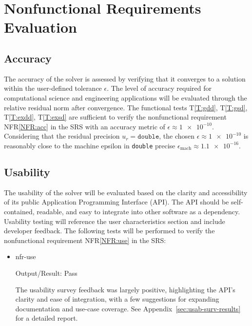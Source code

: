 \documentclass[12pt, titlepage]{article}
\newcommand{\nfrref}[1]{NFR\ref{#1}}
\newcommand{\tref}[1]{T\ref{#1}}
\begin{document}
\section{Nonfunctional Requirements Evaluation}

\subsection{Accuracy}

The accuracy of the solver is assessed by verifying that it converges to a
solution within the user-defined tolerance \(\epsilon\). The level of accuracy
required for computational science and engineering applications will be
evaluated through the relative residual norm after convergence. The functional
tests \tref{T:gdd}, \tref{T:gsd}, \tref{T:exdd}, \tref{T:exsd} are sufficient to
verify the nonfunctional requirement \nfrref{NFR:acc} in the SRS with an
accuracy metric of \(\epsilon \approx \num{1e-10}\). Considering that the
residual precision \(u_r = \texttt{double}\), the chosen \(\epsilon \approx
\num{1e-10}\) is reasonably close to the machine epsilon in \texttt{double}
precise \(\epsilon_\mathrm{mach} \approx \num{1.1e-16}\).

\subsection{Usability}

The usability of the solver will be evaluated based on the clarity and
accessibility of its public Application Programming Interface (API). The API
should be self-contained, readable, and easy to integrate into other software as
a dependency. Usability testing will reference the user characteristics section
and include developer feedback. The following tests will be performed to verify
the nonfunctional requirement \nfrref{NFR:use} in the SRS:

\begin{itemize}

\item[\tref{T:use}:]{nfr-use}

  Output/Result: Pass

  The usability survey feedback was largely positive, highlighting the API’s
  clarity and ease of integration, with a few suggestions for expanding
  documentation and use-case coverage. See Appendix~\ref{sec:usab-surv-results} for
  a detailed report.

\end{itemize}
\end{document}
